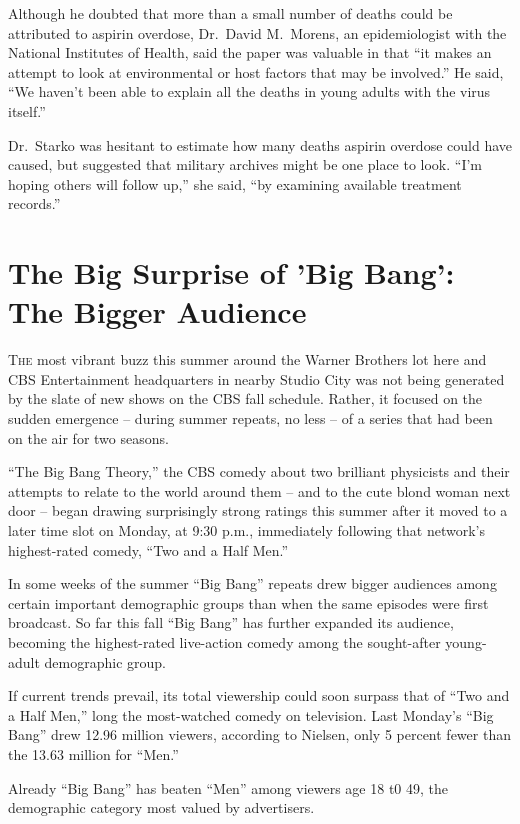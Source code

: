 ﻿\documentclass[12pt]{article}
\begin{document}
Although he doubted that more than a small number of deaths could be attributed to aspirin overdose,
Dr.~David M.~Morens, an epidemiologist with the National Institutes of Health, said the paper was
valuable in that ``it makes an attempt to look at environmental or host factors that may be
involved.'' He said, ``We haven't been able to explain all the deaths in young adults with the virus
itself.''

Dr.~Starko was hesitant to estimate how many deaths aspirin overdose could have caused, but
suggested that military archives might be one place to look. ``I'm hoping others will follow up,''
she said, ``by examining available treatment records.''

\section{The Big Surprise of 'Big Bang': The Bigger Audience}

\lettrine{T}{he} most vibrant buzz this summer around the Warner Brothers
lot here and CBS Entertainment headquarters in nearby Studio City was not being generated by the
slate\cite{slate} of new shows on the CBS fall schedule. Rather, it focused on the sudden emergence
-- during summer repeats, no less -- of a series that had been on the air for two seasons.

``The Big Bang Theory,'' the CBS comedy about two brilliant physicists and their attempts to relate
to the world around them -- and to the cute blond woman next door -- began drawing surprisingly
strong ratings this summer after it moved to a later time slot on Monday, at 9:30 p.m., immediately
following that network's highest-rated comedy, ``Two and a Half Men.''

In some weeks of the summer ``Big Bang'' repeats drew bigger audiences among certain important
demographic groups than when the same episodes were first broadcast. So far this fall ``Big Bang''
has further expanded its audience, becoming the highest-rated live-action comedy among the
sought-after young-adult demographic group.

If current trends prevail, its total viewership could soon surpass that of ``Two and a Half Men,''
long the most-watched comedy on television. Last Monday's ``Big Bang'' drew 12.96 million viewers,
according to Nielsen, only 5 percent fewer than the 13.63 million for ``Men.''

Already ``Big Bang'' has beaten ``Men'' among viewers age 18 t0 49, the demographic category most
valued by advertisers.
\end{document}
